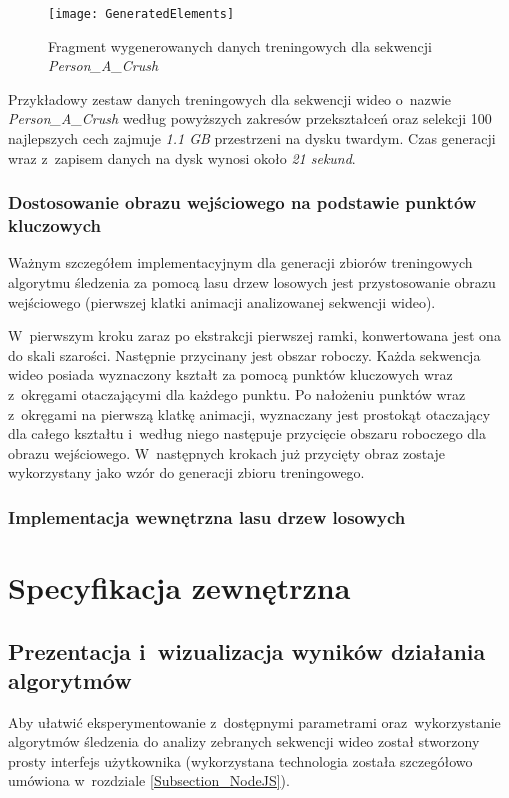   \newpage

  \begin{figure}[!ht]
    \centering
    \texttt{[image: GeneratedElements]}
    \caption[Fragment wygenerowanych danych treningowych dla sekwencji Person\_A\_Crush]{Fragment wygenerowanych danych treningowych dla sekwencji \textit{Person\_A\_Crush}}
    \label{fig:GeneratedElements}
  \end{figure}

  Przykładowy zestaw danych treningowych dla sekwencji wideo o~nazwie \textit{Person\_A\_Crush} według powyższych zakresów przekształceń oraz selekcji 100 najlepszych cech zajmuje \textit{1.1 GB} przestrzeni na dysku twardym. Czas generacji wraz z~zapisem danych na dysk wynosi około \textit{21 sekund}.

  \subsection{Dostosowanie obrazu wejściowego na podstawie punktów kluczowych}\label{Subsection_AdjustFirstFrame}
  Ważnym szczegółem implementacyjnym dla generacji zbiorów treningowych algorytmu śledzenia za pomocą lasu drzew losowych jest przystosowanie obrazu wejściowego (pierwszej klatki animacji analizowanej sekwencji wideo).

  W~pierwszym kroku zaraz po ekstrakcji pierwszej ramki, konwertowana jest ona do skali szarości. Następnie przycinany jest obszar roboczy. Każda sekwencja wideo posiada wyznaczony kształt za pomocą punktów kluczowych wraz z~okręgami otaczającymi dla każdego punktu. Po nałożeniu punktów wraz z~okręgami na pierwszą klatkę animacji, wyznaczany jest prostokąt otaczający dla całego kształtu i~według niego następuje przycięcie obszaru roboczego dla obrazu wejściowego. W~następnych krokach już przycięty obraz zostaje wykorzystany jako wzór do generacji zbioru treningowego.

  \subsection{Implementacja wewnętrzna lasu drzew losowych}


\chapter{Specyfikacja zewnętrzna}\label{Chapter_SpecyfikacjaZewnetrzna}

  \section{Prezentacja i~wizualizacja wyników działania algorytmów}\label{Section_Front}
    Aby ułatwić eksperymentowanie z~dostępnymi parametrami oraz~wykorzystanie algorytmów śledzenia do analizy zebranych sekwencji wideo został stworzony prosty interfejs użytkownika (wykorzystana technologia została szczegółowo umówiona w~rozdziale \ref{Subsection_NodeJS}).

